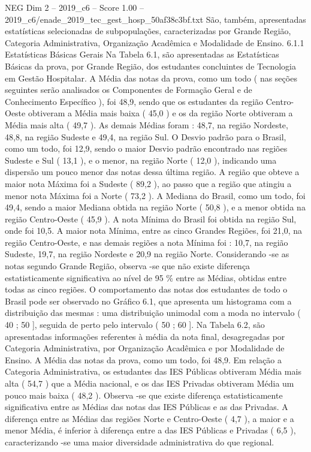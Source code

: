 \begin{textsample}{NEG Dim 2 – 2019\_c6 – Score 1.00 – 2019\_c6/enade\_2019\_tec\_gest\_hosp\_50af38c3bf.txt}
São, também, apresentadas estatísticas selecionadas de subpopulações, caracterizadas por Grande Região, Categoria Administrativa, Organização Acadêmica e Modalidade de Ensino. 6.1.1 Estatísticas Básicas Gerais Na Tabela 6.1, são apresentadas as Estatísticas Básicas da prova, por Grande Região, dos estudantes concluintes de Tecnologia em Gestão Hospitalar.
A Média das notas da prova, como um todo ( nas seções seguintes serão analisados os Componentes de Formação Geral e de Conhecimento Específico ), foi 48,9, sendo que os estudantes da região Centro-Oeste obtiveram a Média mais baixa ( 45,0 ) e os da região Norte obtiveram a Média mais alta ( 49,7 ).
As demais Médias foram : 48,7, na região Nordeste, 48,8, na região Sudeste e 49,4, na região Sul.
O Desvio padrão para o Brasil, como um todo, foi 12,9, sendo o maior Desvio padrão encontrado nas regiões Sudeste e Sul ( 13,1 ), e o menor, na região Norte ( 12,0 ), indicando uma dispersão um pouco menor das notas dessa última região.
A região que obteve a maior nota Máxima foi a Sudeste ( 89,2 ), ao passo que a região que atingiu a menor nota Máxima foi a Norte ( 73,2 ).
A Mediana do Brasil, como um todo, foi 49,4, sendo a maior Mediana obtida na região Norte ( 50,8 ), e a menor obtida na região Centro-Oeste ( 45,9 ).
A nota Mínima do Brasil foi obtida na região Sul, onde foi 10,5.
A maior nota Mínima, entre as cinco Grandes Regiões, foi 21,0, na região Centro-Oeste, e nas demais regiões a nota Mínima foi : 10,7, na região Sudeste, 19,7, na região Nordeste e 20,9 na região Norte.
Considerando -se as notas segundo Grande Região, observa -se que não existe diferença estatisticamente significativa ao nível de 95 \% entre as Médias, obtidas entre todas as cinco regiões.
O comportamento das notas dos estudantes de todo o Brasil pode ser observado no Gráfico 6.1, que apresenta um histograma com a distribuição das mesmas : uma distribuição unimodal com a moda no intervalo ( 40 ; 50 ], seguida de perto pelo intervalo ( 50 ; 60 ].
Na Tabela 6.2, são apresentadas informações referentes à média da nota final, desagregadas por Categoria Administrativa, por Organização Acadêmica e por Modalidade de Ensino.
A Média das notas da prova, como um todo, foi 48,9.
Em relação a Categoria Administrativa, os estudantes das IES Públicas obtiveram Média mais alta ( 54,7 ) que a Média nacional, e os das IES Privadas obtiveram Média um pouco mais baixa ( 48,2 ).
Observa -se que existe diferença estatisticamente significativa entre as Médias das notas das IES Públicas e as das Privadas.
A diferença entre as Médias das regiões Norte e Centro-Oeste ( 4,7 ), a maior e a menor Média, é inferior à diferença entre a das IES Públicas e Privadas ( 6,5 ), caracterizando -se uma maior diversidade administrativa do que regional.

\end{textsample}
